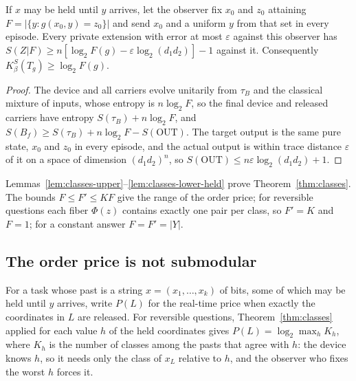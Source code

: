 \begin{lemma}[Held]\label{lem:classes-lower-held}
If $x$ may be held until $y$ arrives, let the observer fix $x_0$ and $z_0$ attaining $F=|\{y:g(x_0,y)=z_0\}|$ and send $x_0$ and a uniform $y$ from that set in every episode. Every private extension with error at most $\varepsilon$ against this observer has $S(Z|F)\ge n[\log_2F(g)-\varepsilon\log_2(d_1d_2)]-1$ against it. Consequently $K_\beta^S(T_g)\ge\log_2F(g)$.
\end{lemma}
\begin{proof}
The device and all carriers evolve unitarily from $\tau_B$ and the classical mixture of inputs, whose entropy is $n\log_2F$, so the final device and released carriers have entropy $S(\tau_B)+n\log_2F$, and $S(B_f)\ge S(\tau_B)+n\log_2F-S(\mathrm{OUT})$. The target output is the same pure state, $x_0$ and $z_0$ in every episode, and the actual output is within trace distance $\varepsilon$ of it on a space of dimension $(d_1d_2)^n$, so $S(\mathrm{OUT})\le n\varepsilon\log_2(d_1d_2)+1$.
\end{proof}

Lemmas~\ref{lem:classes-upper}--\ref{lem:classes-lower-held} prove Theorem~\ref{thm:classes}. The bounds $F\le F'\le KF$ give the range of the order price; for reversible questions each fiber $\Phi(z)$ contains exactly one pair per class, so $F'=K$ and $F=1$; for a constant answer $F=F'=|Y|$.

\subsection{The order price is not submodular}

For a task whose past is a string $x=(x_1,\dots,x_k)$ of bits, some of which may be held until $y$ arrives, write $P(L)$ for the real-time price when exactly the coordinates in $L$ are released. For reversible questions, Theorem~\ref{thm:classes} applied for each value $h$ of the held coordinates gives $P(L)=\log_2\max_hK_h$, where $K_h$ is the number of classes among the pasts that agree with $h$: the device knows $h$, so it needs only the class of $x_L$ relative to $h$, and the observer who fixes the worst $h$ forces it.

